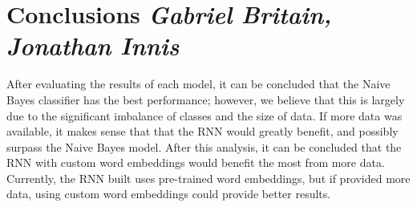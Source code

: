 \documentclass{article}
\begin{document}
\section{Conclusions \textit{Gabriel Britain, Jonathan Innis}}{
  After evaluating the results of each model, it can be concluded that the Naive
  Bayes classifier has the best performance; however, we believe that this is
  largely due to the significant imbalance of classes and the size of data. If
  more data was available, it makes sense that that the RNN would greatly
  benefit, and possibly surpass the Naive Bayes model. After this analysis, it
  can be concluded that the RNN with custom word embeddings would benefit the
  most from more data. Currently, the RNN built uses pre-trained word
  embeddings, but if provided more data, using custom word embeddings could
  provide better results.
 }



\pagebreak
{}

\end{document}
